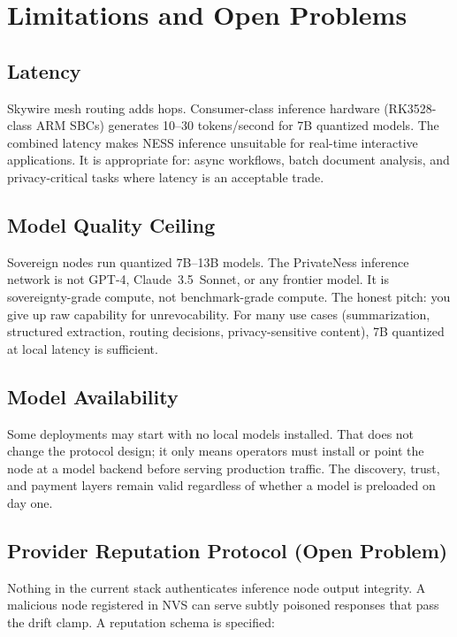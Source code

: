 \documentclass[11pt,a4paper]{article}
\begin{document}
\section{Limitations and Open Problems}
\label{sec:limits}

\subsection{Latency}

Skywire mesh routing adds hops. Consumer-class inference hardware (RK3528-class ARM SBCs) generates 10--30 tokens/second for 7B quantized models. The combined latency makes NESS inference unsuitable for real-time interactive applications. It is appropriate for: async workflows, batch document analysis, and privacy-critical tasks where latency is an acceptable trade.

\subsection{Model Quality Ceiling}

Sovereign nodes run quantized 7B--13B models. The PrivateNess inference network is not GPT-4, Claude~3.5~Sonnet, or any frontier model. It is sovereignty-grade compute, not benchmark-grade compute. The honest pitch: you give up raw capability for unrevocability. For many use cases (summarization, structured extraction, routing decisions, privacy-sensitive content), 7B quantized at local latency is sufficient.

\subsection{Model Availability}

Some deployments may start with no local models installed. That does not change the protocol design; it only means operators must install or point the node at a model backend before serving production traffic. The discovery, trust, and payment layers remain valid regardless of whether a model is preloaded on day one.

\subsection{Provider Reputation Protocol (Open Problem)}

Nothing in the current stack authenticates inference node output integrity. A malicious node registered in NVS can serve subtly poisoned responses that pass the drift clamp. A reputation schema is specified:
\end{document}
